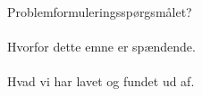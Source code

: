 Problemformuleringsspørgsmålet?\\
\\
Hvorfor dette emne er spændende.\\
\\
Hvad vi har lavet og fundet ud af.
